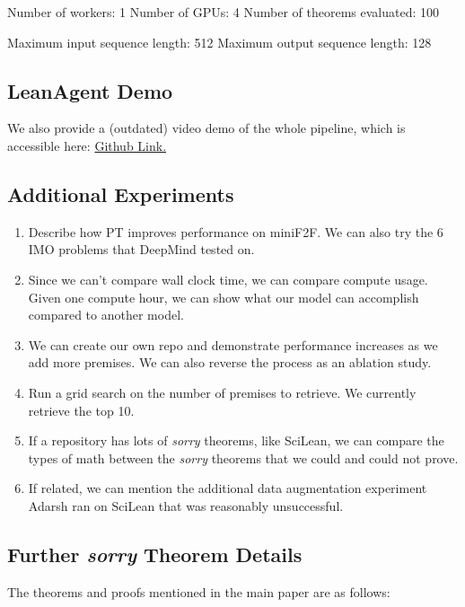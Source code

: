 \documentclass{article} %
\begin{document}
Number of workers: 1
Number of GPUs: 4
Number of theorems evaluated: 100


Maximum input sequence length: 512
Maximum output sequence length: 128


\subsection{LeanAgent Demo}

We also provide a (outdated) video demo of the whole pipeline, which is accessible here: \href{https://github.com/Adarsh321123/CS159FinalProject/tree/backup_branch}{Github Link.}

\subsection{Additional Experiments}

\begin{enumerate}
    \item Describe how PT improves performance on miniF2F. We can also try the 6 IMO problems that DeepMind tested on.
    \item Since we can’t compare wall clock time, we can compare compute usage. Given one compute hour, we can show what our model can accomplish compared to another model.
    \item We can create our own repo and demonstrate performance increases as we add more premises. We can also reverse the process as an ablation study.
    \item Run a grid search on the number of premises to retrieve. We currently retrieve the top 10.
    \item If a repository has lots of \textit{sorry} theorems, like SciLean, we can compare the types of math between the \textit{sorry} theorems that we could and could not prove.
    \item If related, we can mention the additional data augmentation experiment Adarsh ran on SciLean that was reasonably unsuccessful.
\end{enumerate}

\subsection{Further \textit{sorry} Theorem Details}

The theorems and proofs mentioned in the main paper are as follows:
\end{document}
